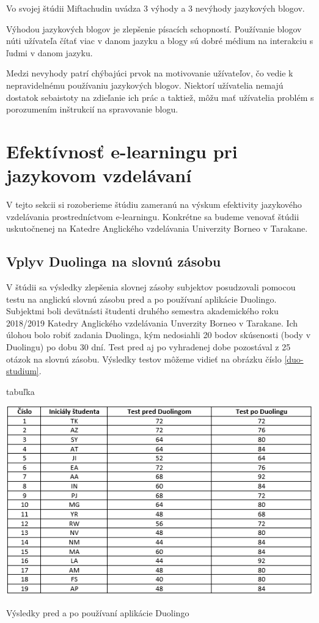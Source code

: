 \documentclass[10pt,oneside,slovak,a4paper]{article}
\begin{document}
Vo svojej štúdii Miftachudin \cite{blog-mif} uvádza 3 výhody a 3 nevýhody jazykových blogov.

Výhodou jazykových blogov je
 zlepšenie písacích schopností.
 Používanie blogov núti užívateľa čítať viac v danom jazyku a
blogy sú dobré médium na interakciu s ľudmi v danom jazyku. \cite{blog-mif}

Medzi nevyhody patrí
 chýbajúci prvok na motivovanie užívateľov, čo vedie k nepravidelnému používaniu jazykových blogov.
Niektorí užívatelia nemajú dostatok sebaistoty na zdieľanie ich prác a taktiež,
môžu mať užívatelia problém s porozumením inštrukcií na spravovanie blogu. \cite{blog-mif}



\section{Efektívnosť e-learningu pri jazykovom vzdelávaní}
\label{3}
V tejto sekcii si rozoberieme štúdiu zameranú na výskum efektivity jazykového vzdelávania prostredníctvom e-learningu. Konkrétne sa budeme venovať štúdii uskutočnenej na Katedre Anglického vzdelávania Univerzity Borneo v Tarakane.

\subsection{Vplyv Duolinga na slovnú zásobu}
V štúdii sa výsledky zlepšenia slovnej zásoby subjektov posudzovali pomocou testu na anglickú slovnú zásobu pred a po používaní aplikácie Duolingo. Subjektmi boli devätnásti študenti druhého semestra akademického roku 2018/2019 Katedry Anglického vzdelávania Unverzity Borneo v Tarakane. Ich úlohou bolo robiť zadania Duolinga, kým nedosiahli 20 bodov skúsenosti (body v Duolingu) po dobu 30 dní. Test pred aj po vyhradenej dobe pozostával z 25 otázok na slovnú zásobu. Výsledky testov môžeme vidieť na obrázku číslo \ref{duo-studium}. \cite{duolingo}

\figurename{tabuľka}
\begin{table}[h] %
\centering
\includegraphics[width=\textwidth,height=0.35\textheight]{duo_studium.png}
\caption{Výsledky pred a po používaní aplikácie Duolingo\cite{duolingo}}
\label{duo-studium}
\end{table}
\end{document}
